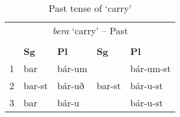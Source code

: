 \documentclass[output=paper,colorlinks,citecolor=brown,
]{langscibook}
\begin{document}

%



\begin{table}[H]
\caption{Past tense of  `carry'} \label{woodbera}

\begin{tabular}{l|l|l|||l|l}
\multicolumn{5}{c}{\textit{bera} `carry' -- Past} \\
\multicolumn{5}{c}{} \\
\hline
  & \textbf{Sg} & \textbf{Pl}  & \textbf{Sg} & \textbf{Pl} \\
  \hline\hline
1 & bar & bár-um  	&  			&  bár-um-st \\
2 & bar-st & bár-uð 		& bar-st 	&  bár-u-st  \\
3 & bar  & bár-u 		& 		& bár-u-st  \\
\end{tabular}
\end{table}
\end{document}
